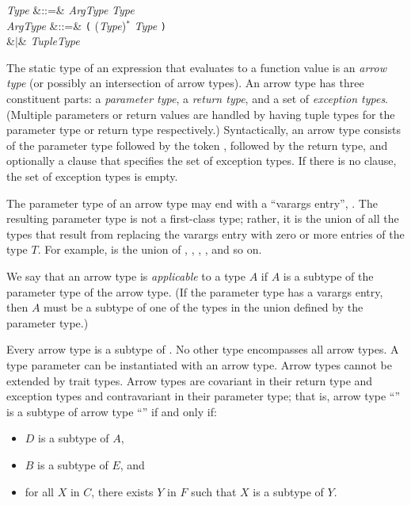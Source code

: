 \begin{Grammar}
\emph{Type} &::=&
\emph{ArgType} \EXP{\rightarrow} \emph{Type}  \\

\emph{ArgType}
&::=& \texttt{(} (\emph{Type}\EXP{,})$^*$
\emph{Type} \texttt{)}\\
&$|$& \emph{TupleType} \\

\end{Grammar}

The static type of an expression
that evaluates to a function value
is an \emph{arrow type}
(or possibly an intersection of arrow types).
An arrow type has three constituent parts:
a \emph{parameter type},
a \emph{return type},
and a set of \emph{exception types}.
(Multiple parameters or return values
are handled by having tuple types for the
parameter type or return type respectively.)
Syntactically, an arrow type consists of the parameter type
followed by the token  \EXP{\rightarrow},
followed by the return type,
and optionally a  clause
that specifies the set of exception types.
If there is no  clause, the set of exception types is empty.


The parameter type of an arrow type may end
with a ``varargs entry'', .
The resulting parameter type is not a first-class type;
rather, it is the union of all the types
that result from replacing the varargs entry
with zero or more entries of the type $T$.
For example,  is the union of \EXP{()}, , ,
, and so on.

We say that an arrow type is \emph{applicable} to a type $A$
if $A$ is a subtype of the parameter type of the arrow type.
(If the parameter type has a varargs entry,
then $A$ must be a subtype of one of the types in the union
defined by the parameter type.)


Every arrow type is a subtype of .
No other type encompasses all arrow types.
A type parameter can be instantiated with an arrow type.
Arrow types cannot be extended by trait types.
Arrow types are covariant in their return type and exception types
and contravariant in their parameter type; that is,
arrow type ``'' is a subtype of arrow type
``'' if and only if:
\begin{itemize}
\item $D$ is a subtype of $A$,
\item $B$ is a subtype of $E$, and
\item for all $X$ in $C$, there exists $Y$ in $F$ such that
$X$ is a subtype of $Y$.
\end{itemize}

